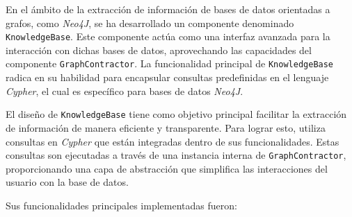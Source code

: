 En el ámbito de la extracción de información de bases de datos orientadas a grafos, como \textit{Neo4J}, se ha desarrollado un componente denominado \texttt{KnowledgeBase}. Este componente actúa como una interfaz avanzada para la interacción con dichas bases de datos, aprovechando las capacidades del componente \texttt{GraphContractor}. La funcionalidad principal de \texttt{KnowledgeBase} radica en su habilidad para encapsular consultas predefinidas en el lenguaje \textit{Cypher}, el cual es específico para bases de datos \textit{Neo4J}.

El diseño de \texttt{KnowledgeBase} tiene como objetivo principal facilitar la extracción de información de manera eficiente y transparente. Para lograr esto, utiliza consultas en \textit{Cypher} que están integradas dentro de sus funcionalidades. Estas consultas son ejecutadas a través de una instancia interna de \texttt{GraphContractor}, proporcionando una capa de abstracción que simplifica las interacciones del usuario con la base de datos.

Sus funcionalidades principales implementadas fueron:

